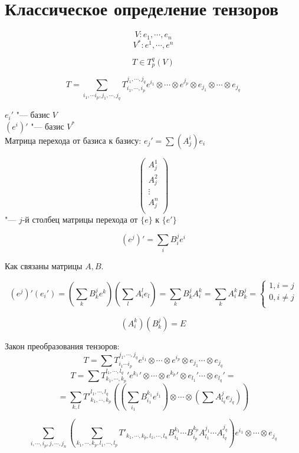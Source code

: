 ﻿\section{Классическое определение тензоров}
$$V\colon e_1, \cdots, e_n$$
$$V^* \colon e^1, \cdots, e^n$$ 

$$T \in T_{p}^q(V)$$

$$T = \sum_{i_1, \cdots i_p, j_1, \cdots, j_q} T_{i_1, \cdots, i_p}^{j_1, \cdots, j_q} e^{i_1} \otimes \cdots \otimes e^{j_p} \otimes e_{j_1} \otimes \cdots \otimes e_{j_q}$$ 

$e_i'$ "--- базис $V$\\
$(e^i)'$ "--- базис $V^*$\\

Матрица перехода от базиса к базису: $e_j' = \sum(A_j^i)e_i$

$$\begin{pmatrix}
A^1_j\\
A^2_j\\
\vdots\\
A^n_j\\
\end{pmatrix}$$
"--- $j$-й столбец матрицы перехода от $\{e\}$ к $\{e'\}$

$$(e^j)' = \sum_{i}B^{j}_ie^i$$

Как связаны матрицы $A, B$.

$$(e^j)'(e_i') = (\sum_k B_{k}^je^k)(\sum_{l}A_{i}^le_l) = \sum_k B_{k}^j A_{i}^k = \sum_k A_i^kB_k^j = \left\{
\begin{aligned} 1, i = j\\ 
0, i \ne j\\
\end{aligned}
\right.$$

$$(A_i^k)(B_k^j) = E$$

Закон преобразования тензоров: 
$$T = \sum T_{i_1 \cdots i_p}^{j_1, \cdots, j_q}e^{i_1} \otimes \cdots \otimes e^{i_p} \otimes e_{j_1} \cdots \otimes e_{j_q}$$
$$T = \sum {T_{k_1, \cdots, k_p}^{l_1, \cdots, l_q}}'{e^{k_1}}' \otimes \cdots \otimes {e^{k_p}}' \otimes {e_{l_1}}' \cdots \otimes {e_{l_q}}' = $$
$$= \sum_{k,l}T'^{l_1, \cdots, l_q}_{k_1, \cdots, k_p}((\sum_{i_1}B_{i_1}^{k_1}e^{i_1}) \otimes \cdots \otimes (\sum A_{l_q}^{j}e_{j_q}))$$

$$\sum_{i, \cdots, i_p, j,\cdots, j_n} (\sum_{k_1,\cdots, k_p, l_1, \cdots, l_p}T'_{k_1, \cdots, k_p, l_1, \cdots, l_n}B_{i_1}^{k_1} \cdots B_{i_p}^{k_p}A_{l_1}^{j_1} \cdots A_{l_q}^{j_q})e^{i_1} \otimes \cdots \otimes e_{j_q}$$